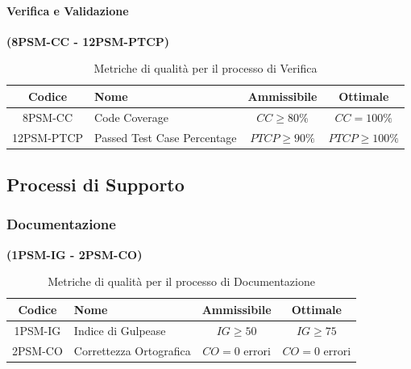 \documentclass{article}
\begin{document}
\paragraph{Verifica e Validazione}%
\textbf{(8PSM-CC - 12PSM-PTCP)}
\begin{table}[H]
    \centering
    \renewcommand{\arraystretch}{1.5} %
    \begin{tabular}{|c|l|c|c|}
        \hline
        \textbf{Codice} & \textbf{Nome} & \textbf{Ammissibile} & \textbf{Ottimale} \\
        \hline
        8PSM-CC & Code Coverage & $CC \geq 80\%$ & $CC = 100\%$ \\
        12PSM-PTCP & Passed Test Case Percentage & $PTCP \geq 90\%$ & $PTCP \geq 100\%$ \\
        \hline
    \end{tabular}
    \label{tab:verifica}
    \caption{Metriche di qualità per il processo di Verifica}
\end{table}

\subsection{Processi di Supporto}
\subsubsection{Documentazione}%
\textbf{(1PSM-IG - 2PSM-CO)}

\begin{table}[H]
    \centering
    \renewcommand{\arraystretch}{1.5} %
    \begin{tabular}{|c|l|c|c|}
        \hline
        \textbf{Codice} & \textbf{Nome} & \textbf{Ammissibile} & \textbf{Ottimale} \\
        \hline
        1PSM-IG & Indice di Gulpease & $IG \geq 50$ & $IG \geq 75$ \\
        2PSM-CO & Correttezza Ortografica & $CO = 0$ errori & $CO = 0$ errori \\ 
        \hline
    \end{tabular}
    \label{tab:documentazione}
    \caption{Metriche di qualità per il processo di Documentazione}
\end{table}
\newpage
\end{document}
